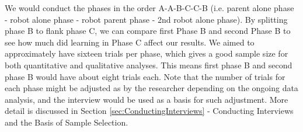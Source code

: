 We would conduct the phases in the order A-A-B-C-C-B (i.e. parent alone phase - robot alone phase - robot parent phase - 2nd robot alone phase).  By splitting phase B to flank phase C, we can compare first Phase B and second Phase B to see how much did learning in Phase C affect our results.  We aimed to approximately have sixteen trials per phase, which gives a good sample size for both quantitative and qualitative analyses.  This means first phase B and second phase B would have about eight trials each.  Note that the number of trials for each phase might be adjusted as by the researcher depending on the ongoing data analysis, and the interview would be used as a basis for such adjustment.  More detail is discussed in Section \ref{sec:ConductingInterviews} - Conducting Interviews and the Basis of Sample Selection.



